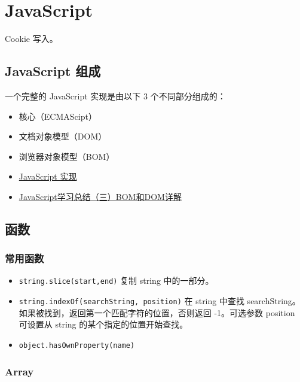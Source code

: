 \section{JavaScript}\label{javascript}

Cookie 写入。

\subsection{JavaScript 组成}\label{javascript-ux7ec4ux6210}

一个完整的 JavaScript 实现是由以下 3 个不同部分组成的：

\begin{itemize}
\item
  核心（ECMAScipt）
\item
  文档对象模型（DOM）
\item
  浏览器对象模型（BOM）
\item
  \href{http://www.w3school.com.cn/js/pro_js_implement.asp}{JavaScript
  实现}
\item
  \href{http://segmentfault.com/a/1190000000654274}{JavaScript学习总结（三）BOM和DOM详解}
\end{itemize}

\subsection{函数}\label{ux51fdux6570}

\subsubsection{常用函数}\label{ux5e38ux7528ux51fdux6570}

\begin{itemize}
\tightlist
\item
  \lstinline!string.slice(start,end)! 复制 string 中的一部分。
\item
  \lstinline!string.indexOf(searchString, position)! 在 string 中查找
  searchString。如果被找到，返回第一个匹配字符的位置，否则返回
  -1。可选参数 position 可设置从 string 的某个指定的位置开始查找。
\item
  \lstinline!object.hasOwnProperty(name)!
\end{itemize}

\subsubsection{Array}\label{array}


